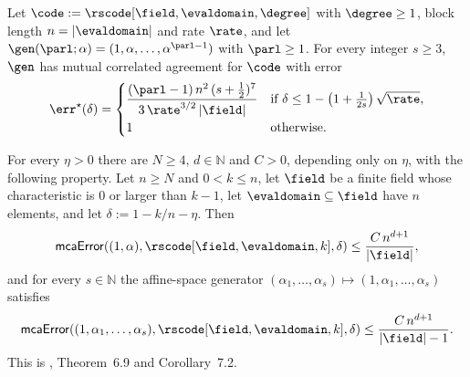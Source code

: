 \begin{theorem}\label{thm:mca_rs_johnson}
\leanok
{}
    Let $\code := \rscode[\field, \evaldomain, \degree]$ with $\degree\ge1$, block length
    $n=|\evaldomain|$ and rate $\rate$, and let
    $\gen(\parl;\alpha)=(1,\alpha,\ldots,\alpha^{\parl-1})$ with $\parl\ge1$. For every integer
    $s\ge3$, $\gen$ has mutual correlated agreement for $\code$ with error
    \[
      \err^\star(\delta)=
      \begin{cases}
        \dfrac{(\parl-1)\, n^2\,(s+\frac12)^7}{3\,\rate^{3/2}\,|\field|}
          & \text{if } \delta\le 1-\left(1+\frac{1}{2s}\right)\sqrt{\rate},\\[8pt]
        1 & \text{otherwise.}
      \end{cases}
    \]
\end{theorem}

\begin{theorem}\label{thm:mca_rs_capacity}
\leanok
{}
    For every $\eta>0$ there are $N\ge4$, $d\in\mathbb{N}$ and $C>0$, depending only on $\eta$,
    with the following property. Let $n\ge N$ and $0<k\le n$, let $\field$ be a finite field
    whose characteristic is $0$ or larger than $k-1$, let $\evaldomain\subseteq\field$ have $n$
    elements, and let $\delta:=1-k/n-\eta$. Then
    \[
      \mathsf{mcaError}((1,\alpha),\rscode[\field,\evaldomain,k],\delta)\le
        \frac{C\,n^{d+1}}{|\field|},
    \]
    and for every $s\in\mathbb{N}$ the affine-space generator
    $(\alpha_1,\ldots,\alpha_s)\mapsto(1,\alpha_1,\ldots,\alpha_s)$ satisfies
    \[
      \mathsf{mcaError}((1,\alpha_1,\ldots,\alpha_s),\rscode[\field,\evaldomain,k],\delta)\le
        \frac{C\,n^{d+1}}{|\field|-1}.
    \]
    This is \cite{DKT26}, Theorem~6.9 and Corollary~7.2.
\end{theorem}

